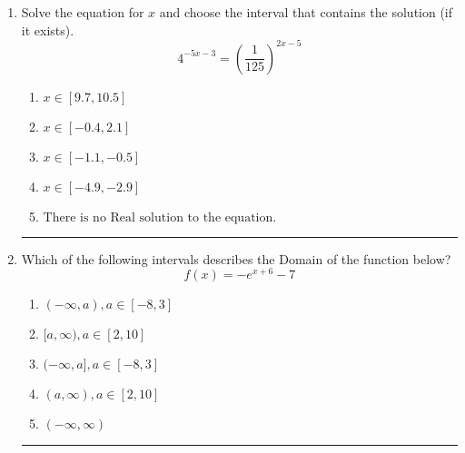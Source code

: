 \documentclass[14pt]{extbook}
\newcommand{\litem}[1]{\item#1\hspace*{-1cm}\rule{\textwidth}{0.4pt}}
\begin{document}
\begin{enumerate}
{\begin{enumerate}[label=\Alph*.]
\end{enumerate} }
\litem{
Solve the equation for $x$ and choose the interval that contains the solution (if it exists).\[ 4^{-5x-3} = \left(\frac{1}{125}\right)^{2x-5} \]\begin{enumerate}[label=\Alph*.]
\item \( x \in [9.7, 10.5] \)
\item \( x \in [-0.4, 2.1] \)
\item \( x \in [-1.1, -0.5] \)
\item \( x \in [-4.9, -2.9] \)
\item \( \text{There is no Real solution to the equation.} \)

\end{enumerate} }
\litem{
Which of the following intervals describes the Domain of the function below?\[ f(x) = -e^{x+6}-7 \]\begin{enumerate}[label=\Alph*.]
\item \( (-\infty, a), a \in [-8, 3] \)
\item \( [a, \infty), a \in [2, 10] \)
\item \( (-\infty, a], a \in [-8, 3] \)
\item \( (a, \infty), a \in [2, 10] \)
\item \( (-\infty, \infty) \)

\end{enumerate} }
\end{enumerate}
\end{document}
